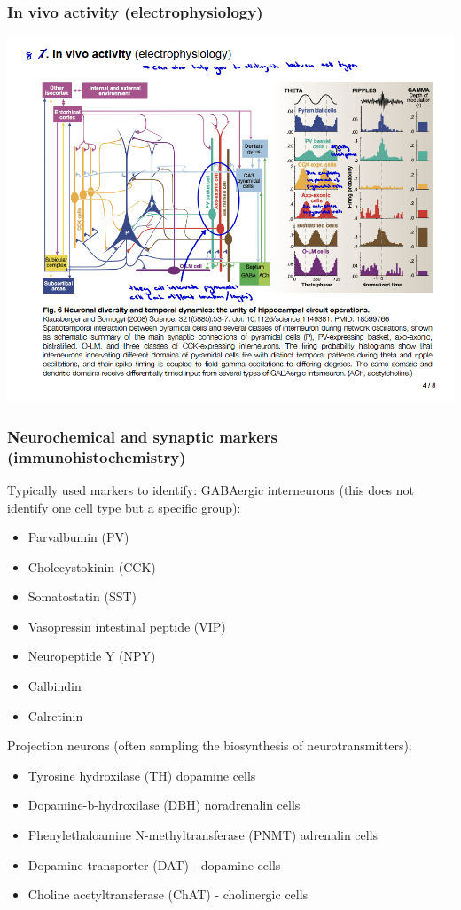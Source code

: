 \begin{itemize}
\begin{itemize}
\subsubsection{In vivo activity (electrophysiology)}
\includegraphics[width=1\textwidth]{Images/INVIVOELEC.png}\\[1cm]

\subsubsection{Neurochemical and synaptic markers (immunohistochemistry)}
Typically used markers to identify:
GABAergic interneurons (this does not identify one cell type but a specific group):
\begin{itemize}
    \item Parvalbumin (PV)
\item Cholecystokinin (CCK)
\item Somatostatin (SST)
\item Vasopressin intestinal peptide (VIP)
\item Neuropeptide Y (NPY)
\item Calbindin
\item Calretinin
\end{itemize}

Projection neurons (often sampling the biosynthesis of
neurotransmitters):
\begin{itemize}
    \item Tyrosine hydroxilase (TH) dopamine cells
\item Dopamine-b-hydroxilase (DBH) noradrenalin cells
\item Phenylethaloamine N-methyltransferase (PNMT)
adrenalin cells
\item Dopamine transporter (DAT) - dopamine cells
\item Choline acetyltransferase (ChAT) - cholinergic cells
\end{itemize}


\end{itemize}
\end{itemize}
